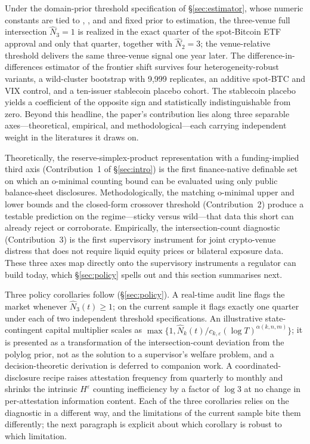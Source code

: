 \documentclass[12pt]{article}
\theoremstyle{sampledef}
\theoremstyle{sampleplain}
\theoremstyle{sampleremark}
\newcommand{\1}{\mathbf{1}}
\begin{document}
Under the domain-prior threshold specification of
\S\ref{sec:estimator}, whose numeric constants are tied to
\citet{BCBS2021Crypto}, \citet{FSB2023Crypto}, and
\citet{Aldasoro2023Stablecoin} and fixed prior to estimation, the
three-venue full intersection $\hat N_3 = 1$ is realized in the
exact quarter of the spot-Bitcoin ETF approval and only that
quarter, together with $\hat N_2 = 3$; the venue-relative threshold
delivers the same three-venue signal one year later. The
difference-in-differences estimator of the frontier shift survives
four heterogeneity-robust variants, a wild-cluster bootstrap with
9{,}999 replicates, an additive spot-BTC and VIX control, and a
ten-issuer stablecoin placebo cohort. The stablecoin placebo yields
a coefficient of the opposite sign and statistically indistinguishable
from zero. Beyond this headline, the paper's contribution lies along
three separable axes---theoretical, empirical, and
methodological---each carrying independent weight in the literatures
it draws on.

Theoretically, the reserve-simplex-product representation with a
funding-implied third axis (Contribution~1 of \S\ref{sec:intro}) is
the first finance-native definable set on which an o-minimal
counting bound can be evaluated using only public balance-sheet
disclosures. Methodologically, the matching o-minimal upper and
lower bounds and the closed-form crossover threshold
(Contribution~2) produce a testable prediction on the
regime---sticky versus wild---that data this short can already
reject or corroborate. Empirically, the intersection-count
diagnostic (Contribution~3) is the first supervisory instrument
for joint crypto-venue distress that does not require liquid equity
prices or bilateral exposure data. These three axes map directly
onto the supervisory instruments a regulator can build today, which
\S\ref{sec:policy} spells out and this section summarises next.

Three policy corollaries follow (\S\ref{sec:policy}). A real-time
audit line flags the market whenever $\hat N_3(t) \ge 1$; on the
current sample it flags exactly one quarter under each of two
independent threshold specifications. An illustrative
state-contingent capital multiplier scales as $\max\{1, \hat N_k(t) /
c_{k,\varepsilon}(\log T)^{\alpha(k,n,m)}\}$; it is presented as a
transformation of the intersection-count deviation from the polylog
prior, not as the solution to a supervisor's welfare problem, and a
decision-theoretic derivation is deferred to companion work. A
coordinated-disclosure recipe raises attestation frequency from
quarterly to monthly and shrinks the intrinsic $H^\varepsilon$
counting inefficiency by a factor of $\log 3$ at no change in
per-attestation information content. Each of the three corollaries
relies on the diagnostic in a different way, and the limitations of
the current sample bite them differently; the next paragraph is
explicit about which corollary is robust to which limitation.
\end{document}
